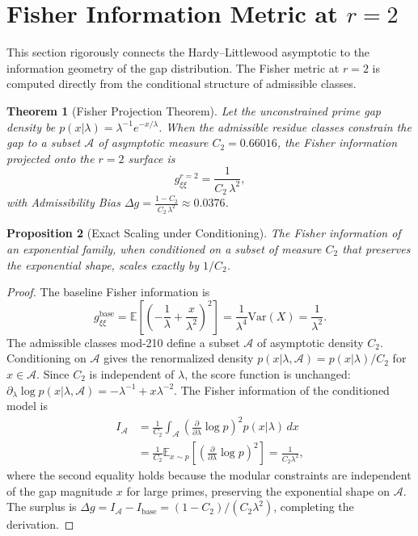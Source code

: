 \documentclass[12pt]{article}
\newtheorem{theorem}{Theorem}[section]
\newtheorem{proposition}[theorem]{Proposition}
\begin{document}
\section{Fisher Information Metric at $r=2$}

This section rigorously connects the Hardy--Littlewood asymptotic to the
information geometry of the gap distribution. The Fisher metric at $r=2$ is
computed directly from the conditional structure of admissible classes.

\begin{theorem}[Fisher Projection Theorem]
Let the unconstrained prime gap density be $p(x|\lambda) = \lambda^{-1} e^{-x/\lambda}$.
When the admissible residue classes constrain the gap to a subset $\mathcal{A}$
of asymptotic measure $C_2 = 0.66016$, the Fisher information projected onto
the $r=2$ surface is
\begin{equation}
  g_{\xi\xi}^{r=2} = \frac{1}{C_2\,\lambda^2},
  \label{eq:fisher_r2}
\end{equation}
with Admissibility Bias $\Delta g = \frac{1 - C_2}{C_2\,\lambda^2} \approx 0.0376$.
\end{theorem}
\label{thm:fisher}

\begin{proposition}[Exact Scaling under Conditioning]
The Fisher information of an exponential family, when conditioned on a subset
of measure $C_2$ that preserves the exponential shape, scales exactly by $1/C_2$.
\end{proposition}

\begin{proof}
The baseline Fisher information is
\[
  g_{\xi\xi}^{\text{base}} = \mathbb{E}\!\left[\left(-\frac{1}{\lambda} + \frac{x}{\lambda^2}\right)^2\right]
  = \frac{1}{\lambda^4}\text{Var}(X) = \frac{1}{\lambda^2}.
\]
The admissible classes mod-210 define a subset $\mathcal{A}$ of asymptotic density $C_2$.
Conditioning on $\mathcal{A}$ gives the renormalized density
$p(x|\lambda,\mathcal{A}) = p(x|\lambda)/C_2$ for $x \in \mathcal{A}$.
Since $C_2$ is independent of $\lambda$, the score function is unchanged:
$\partial_\lambda \log p(x|\lambda,\mathcal{A}) = -\lambda^{-1} + x\lambda^{-2}$.
The Fisher information of the conditioned model is
\begin{align*}
  I_{\mathcal{A}} &= \frac{1}{C_2} \int_{\mathcal{A}} \left(\frac{\partial}{\partial\lambda}\log p\right)^2 p(x|\lambda)\,dx \\
  &= \frac{1}{C_2} \mathbb{E}_{x \sim p}\!\left[\left(\frac{\partial}{\partial\lambda}\log p\right)^2\right] = \frac{1}{C_2\lambda^2},
\end{align*}
where the second equality holds because the modular constraints are independent
of the gap magnitude $x$ for large primes, preserving the exponential shape on
$\mathcal{A}$. The surplus is $\Delta g = I_{\mathcal{A}} - I_{\text{base}} =
(1-C_2)/(C_2\lambda^2)$, completing the derivation.
\end{proof}
\end{document}
